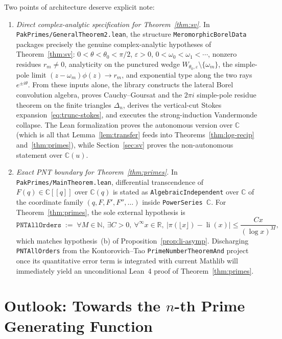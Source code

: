 \documentclass[10pt,reqno]{amsart}
\numberwithin{equation}{section}
\theoremstyle{definition}
\newcommand{\R}{\mathbb{R}}
\newcommand{\C}{\mathbb{C}}
\DeclareMathOperator{\li}{li}
\begin{document}
Two points of architecture deserve explicit note:
\begin{enumerate}[(1)]
  \item \emph{Direct complex-analytic specification for Theorem~\ref{thm:sv}.} In \texttt{PakPrimes/GeneralTheorem2.lean}, the structure \texttt{MeromorphicBorelData} packages precisely the genuine complex-analytic hypotheses of Theorem~\ref{thm:sv}: $0 < \theta < \theta_0 < \pi/2$, $\varepsilon > 0$, $0 < \omega_0 < \omega_1 < \cdots$, nonzero residues $r_m \neq 0$, analyticity on the punctured wedge $W_{\theta_0,\varepsilon} \setminus \{\omega_m\}$, the simple-pole limit $(z - \omega_m)\phi(z) \to r_m$, and exponential type along the two rays $e^{\pm i\theta}$. From these inputs alone, the library constructs the lateral Borel convolution algebra, proves Cauchy--Goursat and the $2\pi i$ simple-pole residue theorem on the finite triangles $\Delta_n$, derives the vertical-cut Stokes expansion~\eqref{eq:trunc-stokes}, and executes the strong-induction Vandermonde collapse. The Lean formalization proves the autonomous version over $\C$ (which is all that Lemma~\ref{lem:transfer} feeds into Theorems~\ref{thm:log-recip} and~\ref{thm:primes}), while Section~\ref{sec:sv} proves the non-autonomous statement over $\C(u)$.
  \item \emph{Exact PNT boundary for Theorem~\ref{thm:primes}.} In \texttt{PakPrimes/MainTheorem.lean}, differential transcendence of $F(q) \in \C[[q]]$ over $\C(q)$ is stated as \texttt{AlgebraicIndependent} over $\C$ of the coordinate family $(q, F, F', F'', \dots)$ inside \texttt{PowerSeries $\C$}. For Theorem~\ref{thm:primes}, the sole external hypothesis is
  \[
    \texttt{PNTAllOrders} \;:=\; \forall M \in \mathbb{N},\ \exists C > 0,\ \forall^{\infty} x \in \R,\ \bigl|\pi(\lfloor x\rfloor) - \li(x)\bigr| \le \frac{C x}{(\log x)^M},
  \]
  which matches hypothesis~(b) of Proposition~\ref{prop:li-asymp}. Discharging \texttt{PNTAllOrders} from the Kontorovich--Tao \texttt{PrimeNumberTheoremAnd} project~\cite{PrimeNumberTheoremAnd} once its quantitative error term is integrated with current Mathlib will immediately yield an unconditional Lean~4 proof of Theorem~\ref{thm:primes}.
\end{enumerate}

\section{Outlook: Towards the \texorpdfstring{$n$-th}{n-th} Prime Generating Function}\label{sec:outlook}
\end{document}
